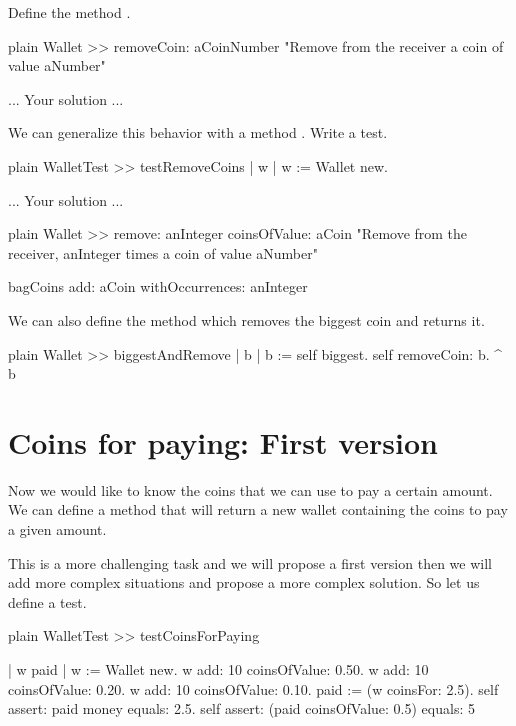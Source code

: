\documentclass[10pt,twoside,english]{_support/latex/sbabook/sbabook}
\begin{document}
Define the method .

\begin{displaycode}{plain}
Wallet >> removeCoin: aCoinNumber
	"Remove from the receiver a coin of value aNumber"
	
	... Your solution ...
\end{displaycode}

We can generalize this behavior with a method .
Write a test.

\begin{displaycode}{plain}
WalletTest >> testRemoveCoins
	| w |
	w := Wallet new.
	
	... Your solution ...
\end{displaycode}

\begin{displaycode}{plain}
Wallet >> remove: anInteger coinsOfValue: aCoin
	"Remove from the receiver, anInteger times a coin of value aNumber"

	bagCoins add: aCoin withOccurrences: anInteger 
\end{displaycode}

We can also define the method  which removes the biggest coin and returns it.

\begin{displaycode}{plain}
Wallet >> biggestAndRemove
	| b |
	b := self biggest.
	self removeCoin: b.
	^ b	
\end{displaycode}
\section{Coins for paying: First version}
Now we would like to know the coins that we can use to pay a certain amount. 
We can define a method  that will return a new wallet containing the coins to 
pay a given amount.

This is a more challenging task and we will propose a first version then we will add more complex situations
and propose a more complex solution. So let us define a test.

\begin{displaycode}{plain}
WalletTest >> testCoinsForPaying

	| w paid |
	w := Wallet new.
	w add: 10 coinsOfValue: 0.50.
	w add: 10 coinsOfValue: 0.20.
	w add: 10 coinsOfValue: 0.10.
	paid := (w coinsFor: 2.5).
	self assert: paid money equals: 2.5.
	self assert: (paid coinsOfValue: 0.5) equals: 5 
\end{displaycode}
\end{document}
